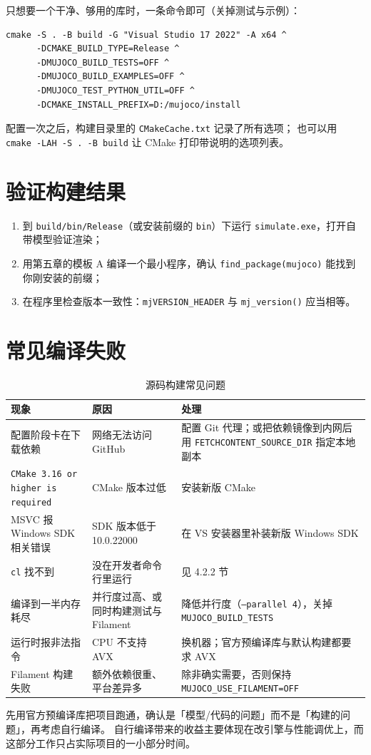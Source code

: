 只想要一个干净、够用的库时，一条命令即可（关掉测试与示例）：

\begin{lstlisting}[style=shell]
cmake -S . -B build -G "Visual Studio 17 2022" -A x64 ^
      -DCMAKE_BUILD_TYPE=Release ^
      -DMUJOCO_BUILD_TESTS=OFF ^
      -DMUJOCO_BUILD_EXAMPLES=OFF ^
      -DMUJOCO_TEST_PYTHON_UTIL=OFF ^
      -DCMAKE_INSTALL_PREFIX=D:/mujoco/install
\end{lstlisting}

\begin{tipbox}[查全部选项]
	配置一次之后，构建目录里的 \texttt{CMakeCache.txt} 记录了所有选项；
	也可以用 \texttt{cmake -LAH -S . -B build} 让 CMake 打印带说明的选项列表。
\end{tipbox}

\section{验证构建结果}

\begin{enumerate}
	\item 到 \texttt{build/bin/Release}（或安装前缀的 \texttt{bin}）下运行 \texttt{simulate.exe}，打开自带模型验证渲染；
	\item 用第五章的模板 A 编译一个最小程序，确认 \texttt{find\_package(mujoco)} 能找到你刚安装的前缀；
	\item 在程序里检查版本一致性：\texttt{mjVERSION\_HEADER} 与 \texttt{mj\_version()} 应当相等。
\end{enumerate}

\section{常见编译失败}

\begin{table}[H]
	\centering
	\caption{源码构建常见问题}
	\label{tab:Build:排错}
	\footnotesize
	\begin{tabular}{>{\raggedright\arraybackslash}p{5.0cm}>{\raggedright\arraybackslash}p{4.4cm}>{\raggedright\arraybackslash}p{4.8cm}}
		\hline
		现象 & 原因 & 处理 \\
		\hline
		配置阶段卡在下载依赖 & 网络无法访问 GitHub & 配置 Git 代理；或把依赖镜像到内网后用 \texttt{FETCHCONTENT\_SOURCE\_DIR} 指定本地副本 \\
		\texttt{CMake 3.16 or higher is required} & CMake 版本过低 & 安装新版 CMake \\
		MSVC 报 Windows SDK 相关错误 & SDK 版本低于 10.0.22000 & 在 VS 安装器里补装新版 Windows SDK \\
		\texttt{cl} 找不到 & 没在开发者命令行里运行 & 见 4.2.2 节 \\
		编译到一半内存耗尽 & 并行度过高、或同时构建测试与 Filament & 降低并行度（\texttt{--parallel 4}），关掉 \texttt{MUJOCO\_BUILD\_TESTS} \\
		运行时报非法指令 & CPU 不支持 AVX & 换机器；官方预编译库与默认构建都要求 AVX \\
		Filament 构建失败 & 额外依赖很重、平台差异多 & 除非确实需要，否则保持 \texttt{MUJOCO\_USE\_FILAMENT=OFF} \\
		\hline
	\end{tabular}
\end{table}

\begin{tipbox}[建议]
	先用官方预编译库把项目跑通，确认是「模型/代码的问题」而不是「构建的问题」，再考虑自行编译。
	自行编译带来的收益主要体现在改引擎与性能调优上，而这部分工作只占实际项目的一小部分时间。
\end{tipbox}
